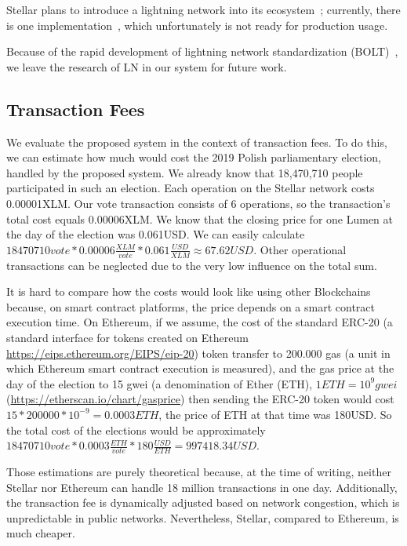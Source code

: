 \documentclass[applsci,article,submit,moreauthors,pdftex]{Definitions/mdpi}
\begin{document}
Stellar plans to introduce a lightning network into its ecosystem~\cite{Lightnin14:online}; currently, there is one implementation~\cite{interste55:online}, which unfortunately is not ready for production usage. 

Because of the rapid development of lightning network standardization (BOLT)~\cite{poon2016bitcoin}, we leave the research of LN in our system for future work. 

\subsection{Transaction Fees}
We evaluate the proposed system in the context of transaction fees. To do this, we can estimate how much would cost the 2019 Polish parliamentary election, handled by the proposed system. We already know that 18,470,710 people participated in such an election. Each operation on the Stellar network costs 0.00001XLM. Our vote transaction consists of 6 operations, so the transaction's total cost equals 0.00006XLM. We know that the closing price for one Lumen at the day of the election was 0.061USD. We can easily calculate \(18470710 vote * 0.00006 \frac{XLM}{vote} * 0.061 \frac{USD}{XLM} \approx 67.62USD\). Other operational transactions can be neglected due to the very low influence on the total sum.

It is hard to compare how the costs would look like using other Blockchains because, on smart contract platforms, the price depends on a smart contract execution time. On Ethereum, if we assume, the cost of the standard ERC-20  (a standard interface for tokens created on Ethereum \url{https://eips.ethereum.org/EIPS/eip-20}) token transfer to 200.000 gas (a unit in which Ethereum smart contract execution is measured), and the gas price at the day of the election to 15 gwei (a denomination of Ether (ETH), $1 ETH = 10^{9} gwei$ (\url{https://etherscan.io/chart/gasprice}) then sending the ERC-20 token would cost $15 * 200000 * 10^{-9} = 0.0003 ETH$, the price of ETH at that time was 
180USD. So the total cost of the elections would be approximately \(18470710 vote * 0.0003 \frac{ETH}{vote} * 180 \frac{USD}{ETH} = 99 7418.34  USD\). 

Those estimations are purely theoretical because, at the time of writing, neither Stellar nor Ethereum can handle 18 million transactions in one day. Additionally, the transaction fee is dynamically adjusted based on network congestion, which is unpredictable in public networks. Nevertheless, Stellar, compared to Ethereum, is much cheaper.
\end{document}
